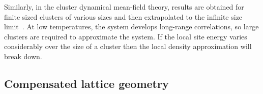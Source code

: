 \documentclass[11pt,letter]{article}
\begin{document}
Similarly, in the cluster dynamical mean-field theory, results are obtained for
finite sized clusters of various sizes and then extrapolated to the infinite
size limit~\cite{Fuchs2011}.  At low temperatures, the system develops
long-range correlations, so large clusters are required to approximate the
system.   If the local site energy varies considerably over the size of a
cluster then the local density approximation will break down.   

\subsection{ Compensated lattice geometry }
 
 

\cite{PhysRevA.86.023606}

 



\end{document}
